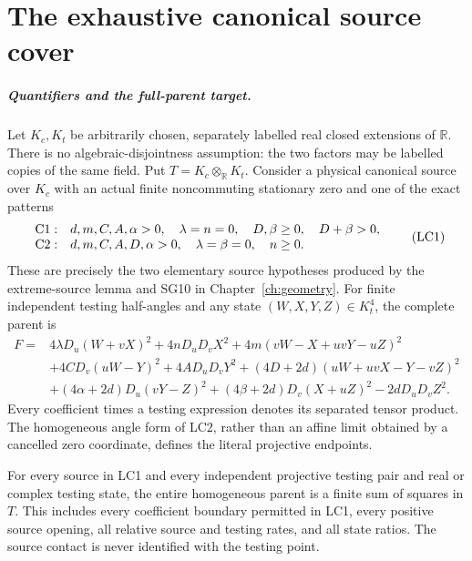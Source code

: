 \chapter{The exhaustive canonical source cover}
\label{ch:cover}
\label{component:pe1088004af65}

\label{pe1088004af65:sec:complete-source-routing}

\paragraph{Quantifiers and the full-parent target.}
Let \(K_c,K_t\) be arbitrarily chosen, separately labelled real closed
extensions of \(\mathbb R\).  There is no algebraic-disjointness
assumption: the two factors may be labelled copies of the same field.
Put \(T=K_c\otimes_{\mathbb R}K_t\).
Consider a physical canonical source over \(K_c\) with an actual
finite noncommuting stationary zero and one of the exact patterns
\[
\begin{array}{ll}
{\rm C1}:&d,m,C,A,\alpha>0,\quad\lambda=n=0,\quad
             D,\beta\geq0,\quad D+\beta>0,\\
{\rm C2}:&d,m,C,A,D,\alpha>0,\quad\lambda=\beta=0,\quad n\geq0.
\end{array}\tag{LC1}
\]
These are precisely the two elementary source hypotheses produced
by the extreme-source lemma and SG10 in Chapter~\ref{ch:geometry}.  For finite independent
testing half-angles and any state \((W,X,Y,Z)\in K_t^4\), the complete
parent is
\[
\begin{split}
 F={}&4\lambda D_u(W+vX)^2+4nD_uD_vX^2
       +4m(vW-X+uvY-uZ)^2\\
 &+4CD_v(uW-Y)^2+4AD_uD_vY^2
       +(4D+2d)(uW+uvX-Y-vZ)^2\\
 &+(4\alpha+2d)D_u(vY-Z)^2
       +(4\beta+2d)D_v(X+uZ)^2-2dD_uD_vZ^2 .
\end{split}\tag{LC2}
\]
Every coefficient times a testing expression denotes its separated
tensor product.  The homogeneous angle form of LC2, rather than
an affine limit obtained by a cancelled zero coordinate, defines
the literal projective endpoints.

\begin{theorem}
For every source in LC1 and every independent projective testing pair
and real or complex testing state, the entire homogeneous parent is
a finite sum of squares in \(T\).
This includes every coefficient boundary permitted in LC1, every
positive source opening, all relative source and testing rates, and
all state ratios.  The source contact is never identified with the
testing point.
\end{theorem}


